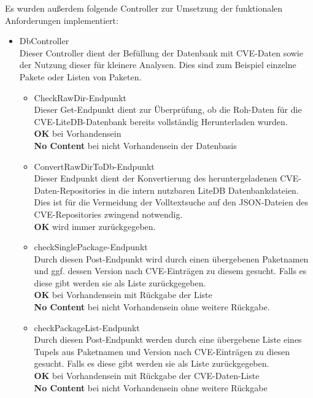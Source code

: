     Es wurden außerdem folgende Controller zur Umsetzung der funktionalen Anforderungen implementiert:
    \begin{itemize}
        \item DbController \label{api_controller:three}\\
            Dieser Controller dient der Befüllung der Datenbank mit \ac{CVE}-Daten sowie der Nutzung dieser für kleinere Analysen. Dies sind zum Beispiel einzelne Pakete oder Listen von Paketen.
            \begin{itemize}
                \item CheckRawDir-Endpunkt \\
                    Dieser Get-Endpunkt dient zur Überprüfung, ob die Roh-Daten für die \ac{CVE}-LiteDB-Datenbank bereits vollständig Herunterladen wurden.
                    \\
                    \textbf{OK} bei Vorhandensein
                    \\
                    \textbf{No Content} bei nicht Vorhandensein der Datenbasis
                \item ConvertRawDirToDb-Endpunkt \\
                    Dieser Endpunkt dient der Konvertierung des heruntergeladenen \ac{CVE}-Daten-Repositories in die intern nutzbaren LiteDB Datenbankdateien.
                    Dies ist für die Vermeidung der Volltextsuche auf den \ac{JSON}-Dateien des \ac{CVE}-Repositories zwingend notwendig.
                    \\
                    \textbf{OK} wird immer zurückgegeben.
                \item checkSinglePackage-Endpunkt \\
                    Durch diesen Post-Endpunkt wird durch einen übergebenen Paketnamen und ggf. dessen Version nach \ac{CVE}-Einträgen zu diesem gesucht.
                    Falls es diese gibt werden sie als Liste zurückgegeben.
                    \\
                    \textbf{OK} bei Vorhandensein mit Rückgabe der Liste
                    \\
                    \textbf{No Content} bei nicht Vorhandensein ohne weitere Rückgabe.
                \item checkPackageList-Endpunkt \\
                    Durch diesen Post-Endpunkt werden durch eine übergebene Liste eines Tupels aus Paketnamen und Version nach \ac{CVE}-Einträgen zu diesen gesucht.
                    Falls es diese gibt werden sie als Liste zurückgegeben.
                    \\
                    \textbf{OK} bei Vorhandensein mit Rückgabe der \ac{CVE}-Daten-Liste
                    \\
                    \textbf{No Content} bei nicht Vorhandensein ohne weitere Rückgabe
            \end{itemize}


\end{itemize}

